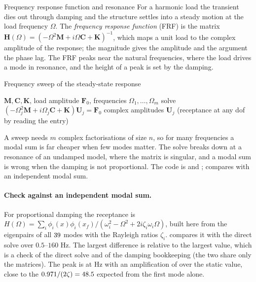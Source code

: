 \begin{sidenote}{Frequency response function and resonance}
For a harmonic load the transient dies out through damping and the structure settles into a steady motion at the load frequency $\Omega$. The \emph{frequency response function} (FRF) is the matrix $\bm H(\Omega)=(-\Omega^2\bm M+i\Omega\bm C+\bm K)^{-1}$, which maps a unit load to the complex amplitude of the response; the magnitude gives the amplitude and the argument the phase lag. The FRF peaks near the natural frequencies, where the load drives a mode in resonance, and the height of a peak is set by the damping.
\end{sidenote}

\begin{algbox}{Frequency sweep of the steady-state response}
\begin{pseudo}
\Require $\bm M,\bm C,\bm K$, load amplitude $\bm F_0$, frequencies $\Omega_1,\dots,\Omega_m$
  \State solve $(-\Omega_j^2\bm M+i\Omega_j\bm C+\bm K)\bm U_j=\bm F_0$ 
\EndFor
\Ensure complex amplitudes $\bm U_j$ (receptance at any dof by reading the entry)
\end{pseudo}
\end{algbox}

A sweep needs $m$ complex factorisations of size $n$, so for many frequencies a modal sum is far cheaper when few modes matter. The solve breaks down at a resonance of an undamped model, where the matrix is singular, and a modal sum is wrong when the damping is not proportional. The code is  and ;  compares with an independent modal sum.

\paragraph{Check against an independent modal sum.}
For proportional damping the receptance is $H(\Omega)=\sum_i\phi_i(x)\phi_i(x_f)/(\omega_i^2-\Omega^2+2i\zeta_i\omega_i\Omega)$, built here from the eigenpairs of all $39$ modes with the Rayleigh ratios $\zeta_i$.  compares it with the direct solve over $0.5$--$160$ Hz. The largest difference is \cdyHarmDiff{} relative to the largest value, which is a check of the direct solve and of the damping bookkeeping (the two share only the matrices). The peak is at \cdyHarmPeakHz{} Hz with an amplification of \cdyHarmAmp{} over the static value, close to the $0.971/(2\zeta)=48.5$ expected from the first mode alone.


